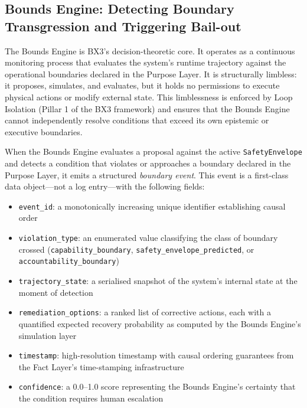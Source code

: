 \subsection{Bounds Engine: Detecting Boundary Transgression and Triggering Bail-out}
\label{sec:bounds-engine-triggering}

The Bounds Engine is BX3's decision-theoretic core. It operates as a continuous monitoring process that evaluates the system's runtime trajectory against the operational boundaries declared in the Purpose Layer. It is structurally limbless: it proposes, simulates, and evaluates, but it holds no permissions to execute physical actions or modify external state. This limblessness is enforced by Loop Isolation (Pillar 1 of the BX3 framework) and ensures that the Bounds Engine cannot independently resolve conditions that exceed its own epistemic or executive boundaries.

When the Bounds Engine evaluates a proposal against the active \texttt{SafetyEnvelope} and detects a condition that violates or approaches a boundary declared in the Purpose Layer, it emits a structured \emph{boundary event}. This event is a first-class data object---not a log entry---with the following fields:

\begin{itemize}
    \item \texttt{event\_id}: a monotonically increasing unique identifier establishing causal order
    \item \texttt{violation\_type}: an enumerated value classifying the class of boundary crossed (\texttt{capability\_boundary}, \texttt{safety\_envelope\_predicted}, or \texttt{accountability\_boundary})
    \item \texttt{trajectory\_state}: a serialised snapshot of the system's internal state at the moment of detection
    \item \texttt{remediation\_options}: a ranked list of corrective actions, each with a quantified expected recovery probability as computed by the Bounds Engine's simulation layer
    \item \texttt{timestamp}: high-resolution timestamp with causal ordering guarantees from the Fact Layer's time-stamping infrastructure
    \item \texttt{confidence}: a 0.0--1.0 score representing the Bounds Engine's certainty that the condition requires human escalation
\end{itemize}

